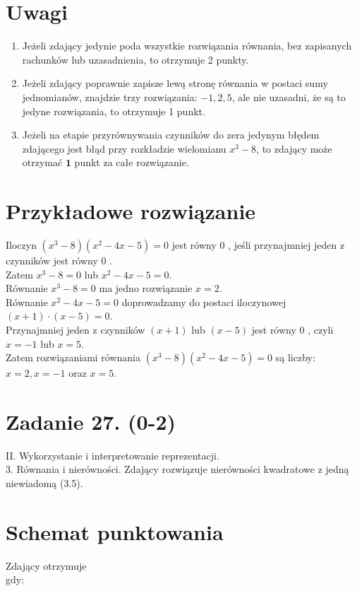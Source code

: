 \documentclass[10pt]{article}
\begin{document}
\section*{Uwagi}
\begin{enumerate}
  \item Jeżeli zdający jedynie poda wszystkie rozwiązania równania, bez zapisanych rachunków lub uzasadnienia, to otrzymuje 2 punkty.
  \item Jeżeli zdający poprawnie zapisze lewą stronę równania w postaci sumy jednomianów, znajdzie trzy rozwiązania: $-1,2,5$, ale nie uzasadni, że są to jedyne rozwiązania, to otrzymuje 1 punkt.
  \item Jeżeli na etapie przyrównywania czynników do zera jedynym błędem zdającego jest błąd przy rozkładzie wielomianu $x^{3}-8$, to zdający może otrzymać $\mathbf{1}$ punkt za całe rozwiązanie.
\end{enumerate}

\section*{Przykładowe rozwiązanie}
Iloczyn $\left(x^{3}-8\right)\left(x^{2}-4 x-5\right)=0$ jest równy 0 , jeśli przynajmniej jeden z czynników jest równy 0 .\\
Zatem $x^{3}-8=0$ lub $x^{2}-4 x-5=0$.\\
Równanie $x^{3}-8=0$ ma jedno rozwiązanie $x=2$.\\
Równanie $x^{2}-4 x-5=0$ doprowadzamy do postaci iloczynowej $(x+1) \cdot(x-5)=0$.\\
Przynajmniej jeden z czynników $(x+1)$ lub $(x-5)$ jest równy 0 , czyli $x=-1$ lub $x=5$.\\
Zatem rozwiązaniami równania $\left(x^{3}-8\right)\left(x^{2}-4 x-5\right)=0$ są liczby: $x=2, x=-1$ oraz $x=5$.

\section*{Zadanie 27. (0-2)}
II. Wykorzystanie i interpretowanie reprezentacji.\\
3. Równania i nierówności. Zdający rozwiązuje nierówności kwadratowe z jedną niewiadomą (3.5).

\section*{Schemat punktowania}
Zdający otrzymuje\\
gdy:
\end{document}
